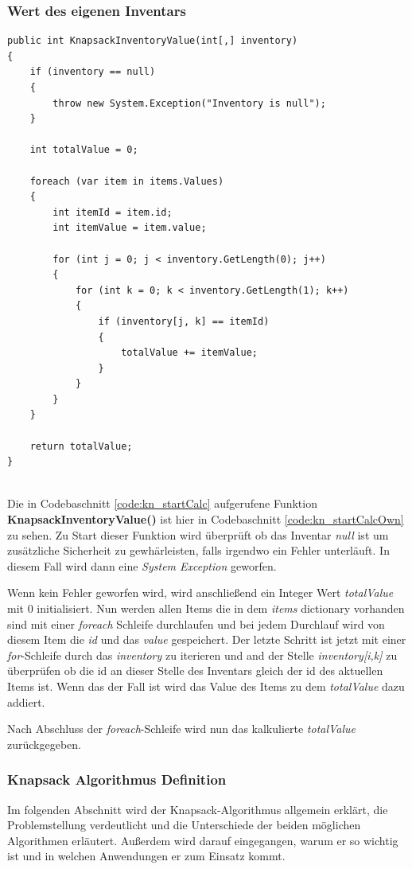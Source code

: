 \subsubsection{Wert des eigenen Inventars}
\begin{lstlisting}[style=csharp, caption={Wert des selbst zusammengestellten Inventars berechnen}, label=code:kn_startCalcOwn]
public int KnapsackInventoryValue(int[,] inventory)
{
    if (inventory == null)
    {
        throw new System.Exception("Inventory is null");
    }

    int totalValue = 0;

    foreach (var item in items.Values)
    {
        int itemId = item.id;
        int itemValue = item.value;

        for (int j = 0; j < inventory.GetLength(0); j++)
        {
            for (int k = 0; k < inventory.GetLength(1); k++)
            {
                if (inventory[j, k] == itemId)
                {
                    totalValue += itemValue;
                }
            }
        }
    }

    return totalValue;
}
\end{lstlisting}\\
Die in Codebaschnitt \ref{code:kn_startCalc} aufgerufene Funktion \textbf{KnapsackInventoryValue()} ist hier in Codebaschnitt
\ref{code:kn_startCalcOwn} zu sehen. Zu Start dieser Funktion wird überprüft ob das Inventar \textit{null} ist um zusätzliche
Sicherheit zu gewhärleisten, falls irgendwo ein Fehler unterläuft. In diesem Fall wird dann eine \textit{System Exception}
geworfen.

Wenn kein Fehler geworfen wird, wird anschließend ein Integer Wert \textit{totalValue} mit 0 initialisiert. Nun werden allen
Items die in dem \textit{items} dictionary vorhanden sind mit einer \textit{foreach} Schleife durchlaufen und bei jedem
Durchlauf wird von diesem Item die \textit{id} und das \textit{value} gespeichert. Der letzte Schritt ist jetzt mit
einer \textit{for}-Schleife durch das \textit{inventory} zu iterieren und and der Stelle \textit{inventory[i,k]} zu überprüfen
ob die id an dieser Stelle des Inventars gleich der id des aktuellen Items ist. Wenn das der Fall ist wird das Value des
Items zu dem \textit{totalValue} dazu addiert.

Nach Abschluss der \textit{foreach}-Schleife wird nun das kalkulierte \textit{totalValue} zurückgegeben.\\

\subsubsection{Knapsack Algorithmus Definition}
Im folgenden Abschnitt wird der Knapsack-Algorithmus allgemein erklärt, die Problemstellung verdeutlicht und die
Unterschiede der beiden möglichen Algorithmen erläutert. Außerdem wird darauf eingegangen, warum er so wichtig ist
und in welchen Anwendungen er zum Einsatz kommt.

